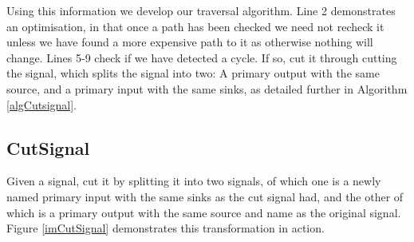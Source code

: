 \documentclass[12pt,final,oneside]{dwThesis} %
\begin{document}
   Using this information we develop our traversal
   algorithm.  Line 2 demonstrates an optimisation, in that once a path has
   been checked we need not recheck it unless we have found a more expensive
   path to it as otherwise nothing will change.  Lines 5-9 check if we have
   detected a cycle. If so, cut it through cutting the signal, which splits
   the signal into two: A primary output with the same source, and a primary
   input with the same sinks, as detailed further in Algorithm
   \ref{algCutsignal}.

   \newpage 
   \subsection{CutSignal}
   \label{cutsignal}
   Given a signal, cut it by
   splitting it into two signals, of which one is a newly named primary input
   with the same sinks as the cut signal had, and the other of which is a
   primary output with the same source and name as the original signal.
   Figure \ref{imCutSignal} demonstrates this transformation in action.
\end{document}
